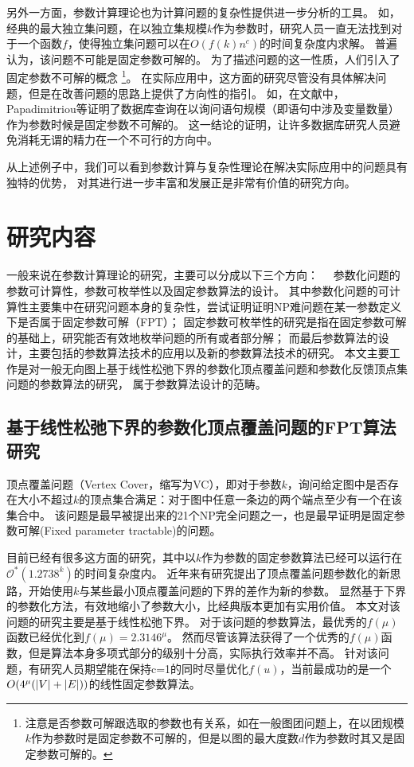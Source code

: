 另外一方面，参数计算理论也为计算问题的复杂性提供进一步分析的工具。
如，经典的最大独立集问题，在以独立集规模$k$作为参数时，研究人员一直无法找到对于一个函数$f$，使得独立集问题可以在$O(f(k)n^c)$的时间复杂度内求解。
普遍认为，该问题不可能是固定参数可解的。
为了描述问题的这一性质，人们引入了固定参数不可解的概念
\footnote{注意是否参数可解跟选取的参数也有关系，如在一般图团问题上，在以团规模$k$作为参数时是固定参数不可解的，但是以图的最大度数$d$作为参数时其又是固定参数可解的。}。
在实际应用中，这方面的研究尽管没有具体解决问题，但是在改善问题的思路上提供了方向性的指引。
如，在文献\cite{papadimitriou1997complexity}中，Papadimitriou等证明了数据库查询在以询问语句规模（即语句中涉及变量数量）作为参数时候是固定参数不可解的。
这一结论的证明，让许多数据库研究人员避免消耗无谓的精力在一个不可行的方向中。


从上述例子中，我们可以看到参数计算与复杂性理论在解决实际应用中的问题具有独特的优势，
对其进行进一步丰富和发展正是非常有价值的研究方向。


\section{研究内容}
一般来说在参数计算理论的研究，主要可以分成以下三个方向：　
参数化问题的参数可计算性，参数可枚举性以及固定参数算法的设计。
其中参数化问题的可计算性主要集中在研究问题本身的复杂性，尝试证明证明NP难问题在某一参数定义下是否属于固定参数可解（FPT）；
固定参数可枚举性的研究是指在固定参数可解的基础上，研究能否有效地枚举问题的所有或者部分解；
而最后参数算法的设计，主要包括的参数算法技术的应用以及新的参数算法技术的研究。
本文主要工作是对一般无向图上基于线性松弛下界的参数化顶点覆盖问题和参数化反馈顶点集问题的参数算法的研究，
属于参数算法设计的范畴。

\subsection{基于线性松弛下界的参数化顶点覆盖问题的FPT算法研究}
顶点覆盖问题（Vertex Cover，缩写为VC），即对于参数$k$，询问给定图中是否存在大小不超过$k$的顶点集合满足：对于图中任意一条边的两个端点至少有一个在该集合中。
该问题是最早被提出来的21个NP完全问题之一，也是最早证明是固定参数可解(Fixed parameter tractable)的问题。

目前已经有很多这方面的研究，其中以$k$作为参数的固定参数算法已经可以运行在$\mathcal{O}^*(1.2738^k)$的时间复杂度内。
近年来有研究提出了顶点覆盖问题参数化的新思路，开始使用$k$与某些最小顶点覆盖问题的下界的差作为新的参数。
显然基于下界的参数化方法，有效地缩小了参数大小，比经典版本更加有实用价值。
本文对该问题的研究主要是基于线性松弛下界。
对于该问题的参数算法，最优秀的$f(\mu)$函数已经优化到$f(\mu) = 2.3146^\mu$。
然而尽管该算法获得了一个优秀的$f(\mu)$函数，但是算法本身多项式部分的级别十分高，实际执行效率并不高。
针对该问题，有研究人员期望能在保持c=1的同时尽量优化$f(u)$，当前最成功的是一个$O(4^{\mu}(\left\vert V \right\vert+\left\vert E \right\vert))$的线性固定参数算法。

